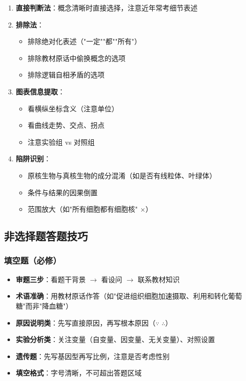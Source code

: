 \begin{enumerate}
  \item \textbf{直接判断法}：概念清晰时直接选择，注意近年常考细节表述
  \item \textbf{排除法}：
  \begin{itemize}
    \item 排除绝对化表述（"一定""都""所有"）
    \item 排除教材原话中偷换概念的选项
    \item 排除逻辑自相矛盾的选项
  \end{itemize}
  \item \textbf{图表信息提取}：
  \begin{itemize}
    \item 看横纵坐标含义（注意单位）
    \item 看曲线走势、交点、拐点
    \item 注意实验组 vs 对照组
  \end{itemize}
  \item \textbf{陷阱识别}：
  \begin{itemize}
    \item 原核生物与真核生物的成分混淆（如是否有线粒体、叶绿体）
    \item 条件与结果的因果倒置
    \item 范围放大（如"所有细胞都有细胞核" ×）
  \end{itemize}
\end{enumerate}

\subsection{非选择题答题技巧}

\subsubsection{填空题（必修）}

\begin{itemize}
  \item \textbf{审题三步}：看题干背景 $\to$ 看设问 $\to$ 联系教材知识
  \item \textbf{术语准确}：用教材原话作答（如"促进组织细胞加速摄取、利用和转化葡萄糖"而非"降血糖"）
  \item \textbf{原因说明类}：先写直接原因，再写根本原因（$\because$ $\therefore$）
  \item \textbf{实验分析类}：关注变量（自变量、因变量、无关变量）、对照设置
  \item \textbf{遗传题}：先写基因型再写比例，注意是否考虑性别
  \item \textbf{填空格式}：字号清晰，不可超出答题区域
\end{itemize}

